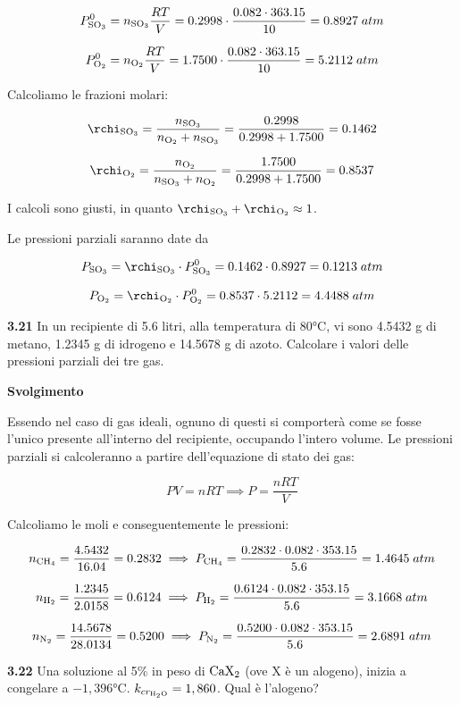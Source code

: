 $$P^0_{\rm SO_3}=n_{\rm SO_3} \displaystyle \frac{RT}{V}
=0.2998 \cdot \frac{0.082 \cdot 363.15}{10}
=0.8927\;atm$$

$$P^0_{\rm O_2}=n_{\rm O_2} \displaystyle \frac{RT}{V}
=1.7500 \cdot \frac{0.082 \cdot 363.15}{10}
=5.2112\;atm$$

Calcoliamo le frazioni molari:

$$\rchi_{\rm SO_3}=\frac{n_{\rm SO_3}}{n_{\rm O_2} + n_{\rm SO_3}}=\frac{0.2998}{0.2998 + 1.7500}=0.1462$$

$$\rchi_{\rm O_2}=\frac{n_{\rm O_2}}{n_{\rm SO_3} + n_{\rm O_2}}=\frac{1.7500}{0.2998 + 1.7500}=0.8537$$

I calcoli sono giusti, in quanto $\rchi_{\rm SO_3} + \rchi_{\rm O_2} \approx 1$.

Le pressioni parziali saranno date da

$$P_{\rm SO_3}=\rchi_{\rm SO_3} \cdot P^0_{\rm SO_3}
=0.1462 \cdot 0.8927=0.1213\;atm$$

$$P_{\rm O_2}=\rchi_{\rm O_2} \cdot P^0_{\rm O_2}
=0.8537 \cdot 5.2112=4.4488\;atm$$

\vspace{0.2cm}\textbf{3.21} In un recipiente di 5.6 litri, alla temperatura di 80°C, vi sono 4.5432 g di metano, 1.2345 g di idrogeno e 14.5678 g di azoto. Calcolare i valori delle pressioni parziali dei tre gas. 

\vspace{0.2cm}\large\textbf{Svolgimento}\normalsize

\vspace{0.2cm}Essendo nel caso di gas ideali, ognuno di questi si comporterà come se fosse l'unico presente all'interno del recipiente, occupando l'intero volume. Le pressioni parziali si calcoleranno a partire dell'equazione di stato dei gas:

$$PV=nRT
\implies
P=\frac{nRT}{V}$$

Calcoliamo le moli e conseguentemente le pressioni:

$$n_{\rm CH_4}=\frac{4.5432}{16.04}=0.2832
\implies
P_{\rm CH_4}=\frac{0.2832 \cdot 0.082 \cdot 353.15}{5.6}=1.4645\;atm$$

$$n_{\rm H_2}=\frac{1.2345}{2.0158}=0.6124
\implies
P_{\rm H_2}=\frac{0.6124 \cdot 0.082 \cdot 353.15}{5.6}=3.1668\;atm$$

$$n_{\rm N_2}=\frac{14.5678}{28.0134}=0.5200
\implies
P_{\rm N_2}=\frac{0.5200 \cdot 0.082 \cdot 353.15}{5.6}=2.6891\;atm$$

\vspace{0.2cm}\textbf{3.22} Una soluzione al 5\% in peso di $\rm CaX_2$ (ove X è un alogeno), inizia a congelare a $-1,396$°C. $k_{cr_{\rm H_2O}} = 1,860$. Qual è l'alogeno? 


